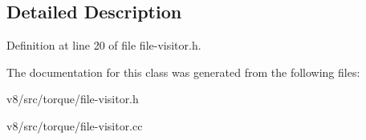\subsection{Detailed Description}


Definition at line 20 of file file-\/visitor.\+h.



The documentation for this class was generated from the following files\+:\begin{DoxyCompactItemize}
\item 
v8/src/torque/file-\/visitor.\+h\item 
v8/src/torque/file-\/visitor.\+cc\end{DoxyCompactItemize}
